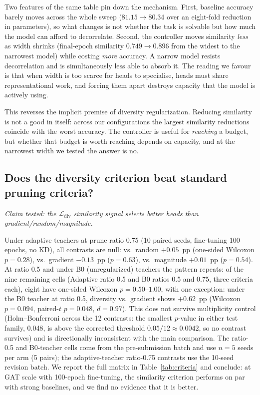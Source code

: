 \documentclass{ws-ijprai}
\newcommand{\Ldiv}{\mathcal{L}_{\mathrm{div}}}
\begin{document}
Two features of the same table pin down the mechanism. First, baseline accuracy
barely moves across the whole sweep ($81.15 \to 80.34$ over an eight-fold
reduction in parameters), so what changes is not whether the task is solvable
but how much the model can afford to decorrelate. Second, the controller moves
similarity \emph{less} as width shrinks (final-epoch similarity $0.749 \to
0.896$ from the widest to the narrowest model) while costing \emph{more}
accuracy. A narrow model resists decorrelation and is simultaneously less able
to absorb it. The reading we favour is that when width is too scarce for heads
to specialise, heads must share representational work, and forcing them apart
destroys capacity that the model is actively using.

This reverses the implicit premise of diversity regularization. Reducing
similarity is not a good in itself: across our configurations the largest
similarity reductions coincide with the worst accuracy. The controller is
useful for \emph{reaching} a budget, but whether that budget is worth reaching
depends on capacity, and at the narrowest width we tested the answer is no.



\subsection{Does the diversity criterion beat standard pruning criteria?}
\label{sec:h2}

\emph{Claim tested: the $\Ldiv$ similarity signal selects better heads than
gradient/random/magnitude.}

Under adaptive teachers at prune ratio 0.75 (10 paired seeds, fine-tuning 100
epochs, no KD), all contrasts are null: vs.\ random $+0.05$~pp (one-sided
Wilcoxon $p=0.28$), vs.\ gradient $-0.13$~pp ($p=0.63$), vs.\ magnitude
$+0.01$~pp ($p=0.54$). At ratio 0.5 and under B0 (unregularized) teachers the
pattern
repeats: of the nine remaining cells (Adaptive ratio 0.5 and B0 ratios 0.5
and 0.75, three criteria each), eight have one-sided Wilcoxon
$p=0.50$--$1.00$, with one exception: under the B0 teacher at ratio 0.5,
diversity vs.\ gradient shows $+0.62$~pp (Wilcoxon $p=0.094$, paired-$t$
$p=0.048$, $d=0.97$). This does not survive multiplicity control
(Holm--Bonferroni across the 12 contrasts: the smallest $p$-value in either
test family, 0.048, is above the corrected threshold $0.05/12 \approx 0.0042$,
so no contrast survives) and is directionally inconsistent with the main
comparison. The ratio-0.5 and
B0-teacher cells come from the pre-submission batch and use $n=5$ seeds per
arm (5 pairs); the adaptive-teacher ratio-0.75 contrasts use the 10-seed
revision batch. We report
the full matrix in Table~\ref{tab:criteria} and conclude: at GAT scale with
100-epoch fine-tuning, the similarity criterion performs on par with strong
baselines, and we find no evidence that it is better.
\end{document}

